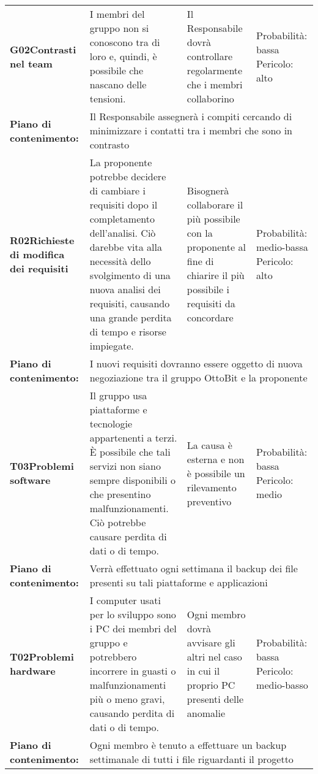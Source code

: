 \begin{longtable}{>{\bfseries}p{2.5cm} p{4.5cm} p{4.5cm} p{2.5cm}}
		\hline
		G02\newline Contrasti nel team
		& I membri del gruppo non si conoscono tra di loro e, quindi, è possibile che nascano delle tensioni. 
		&  Il Responsabile dovrà controllare regolarmente che i membri collaborino
		& Probabilità: bassa \newline Pericolo: alto \\
		\rowcolor{LightGray}
		Piano di contenimento: 
		& \multicolumn{3}{p{12.5cm}}{Il Responsabile assegnerà i compiti cercando di minimizzare i contatti tra i membri che sono in contrasto}\\[0.5cm]

		\hline
		R02\newline Richieste di modifica dei requisiti
		& La proponente potrebbe decidere di cambiare i requisiti dopo il completamento dell'analisi. Ciò darebbe vita alla necessità dello svolgimento di una nuova analisi dei requisiti, causando una grande perdita di tempo e risorse impiegate.
		& Bisognerà collaborare il più possibile con la proponente al fine di chiarire il più possibile i requisiti da concordare
		& Probabilità: medio-bassa \newline Pericolo: alto \\
		\rowcolor{LightGray}
		Piano di contenimento:
		& \multicolumn{3}{p{12.5cm}}{I nuovi requisiti dovranno essere oggetto di nuova negoziazione tra il gruppo OttoBit e la proponente}\\[0.5cm]

		\hline
		T03\newline Problemi software
		& Il gruppo usa piattaforme e tecnologie appartenenti a terzi. \`E possibile che tali servizi non siano sempre disponibili o che presentino malfunzionamenti. Ciò potrebbe causare perdita di dati o di tempo.
		& La causa è esterna e non è possibile un rilevamento preventivo
		& Probabilità: bassa \newline Pericolo: medio \\
		\rowcolor{LightGray}
		Piano di contenimento: 
		& \multicolumn{3}{p{12.5cm}}{Verrà effettuato ogni settimana il backup dei file presenti su tali piattaforme e applicazioni}\\[0.5cm]

		\hline
		T02\newline Problemi hardware
		& I computer usati per lo sviluppo sono i PC dei membri del gruppo e potrebbero incorrere in guasti o malfunzionamenti più o meno gravi, causando perdita di dati o di tempo. 
		& Ogni membro dovrà avvisare gli altri nel caso in cui il proprio PC presenti delle anomalie
		& Probabilità: bassa \newline Pericolo: medio-basso \\
		\rowcolor{LightGray}
		Piano di contenimento: 
		& \multicolumn{3}{p{12.5cm}}{Ogni membro è tenuto a effettuare un backup settimanale di tutti i file riguardanti il progetto}\\[0.5cm]
\end{longtable}